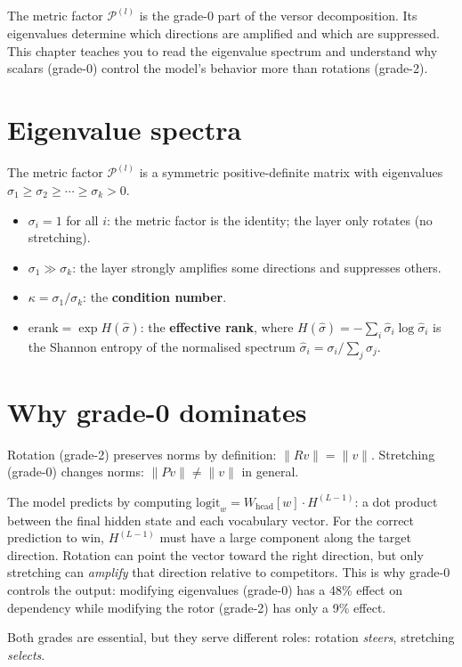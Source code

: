 \documentclass[11pt, twoside, openright]{memoir}
\newcommand{\metric}[1]{\mathcal{P}^{(#1)}} %
\begin{document}
\begin{whycare}
The metric factor $\metric{l}$ is the grade-0 part of the versor
decomposition.  Its eigenvalues determine which directions are amplified
and which are suppressed.  This chapter teaches you to read the
eigenvalue spectrum and understand why scalars (grade-0) control the
model's behavior more than rotations (grade-2).
\end{whycare}

\section{Eigenvalue spectra}

The metric factor $\metric{l}$ is a symmetric positive-definite matrix
with eigenvalues $\sigma_1 \geq \sigma_2 \geq \cdots \geq \sigma_k > 0$.

\begin{itemize}[nosep]
\item $\sigma_i = 1$ for all $i$: the metric factor is the identity;
  the layer only rotates (no stretching).
\item $\sigma_1 \gg \sigma_k$: the layer strongly amplifies some
  directions and suppresses others.
\item $\kappa = \sigma_1 / \sigma_k$: the \textbf{condition number}.
\item $\mathrm{erank} = \exp H(\hat{\sigma})$: the \textbf{effective
  rank}, where $H(\hat{\sigma}) = -\sum_i \hat{\sigma}_i \log
  \hat{\sigma}_i$ is the Shannon entropy of the normalised spectrum
  $\hat{\sigma}_i = \sigma_i / \sum_j \sigma_j$.
\end{itemize}

\section{Why grade-0 dominates}

\begin{keyidea}
Rotation (grade-2) preserves norms by definition: $\|Rv\| = \|v\|$.
Stretching (grade-0) changes norms: $\|Pv\| \neq \|v\|$ in general.

The model predicts by computing $\mathrm{logit}_w = W_{\mathrm{head}}[w]
\cdot H^{(L-1)}$: a dot product between the final hidden state and each
vocabulary vector.  For the correct prediction to win, $H^{(L-1)}$ must
have a large component along the target direction.  Rotation can point the
vector toward the right direction, but only stretching can
\emph{amplify} that direction relative to competitors.  This is why
grade-0 controls the output: modifying eigenvalues (grade-0) has a 48\%
effect on dependency while modifying the rotor (grade-2) has only a
9\% effect.

Both grades are essential, but they serve different roles: rotation
\emph{steers}, stretching \emph{selects}.
\end{keyidea}
\end{document}
